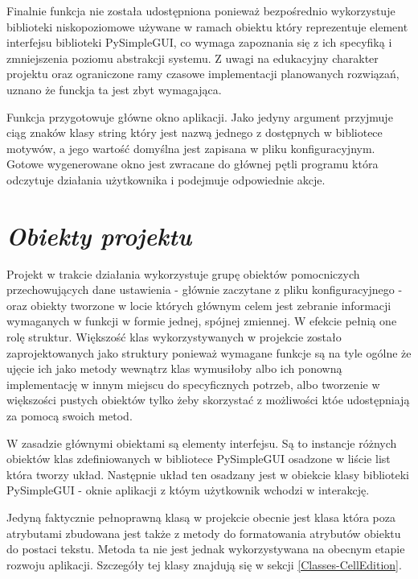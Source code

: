 \documentclass[a4paper,10pt, twoside]{report}
\newcommand{\customstylesection}[1]{\textbf{\textit{#1}}}
\begin{document}
{Finalnie funkcja nie została udostępniona ponieważ bezpośrednio wykorzystuje 
biblioteki niskopoziomowe używane w ramach obiektu który reprezentuje element 
interfejsu biblioteki PySimpleGUI, co wymaga zapoznania się z ich specyfiką i 
zmniejszenia poziomu abstrakcji systemu. Z uwagi na edukacyjny charakter 
projektu oraz ograniczone ramy czasowe implementacji planowanych rozwiązań, 
uznano że funckja ta jest zbyt wymagająca.}

\medskip
{Funkcja  przygotowuje główne okno 
aplikacji. Jako jedyny argument  przyjmuje ciąg znaków klasy 
string który jest nazwą jednego z dostępnych w bibliotece motywów, a jego 
wartość domyślna jest zapisana w pliku konfiguracyjnym. Gotowe wygenerowane okno
 jest zwracane do głównej pętli programu która odczytuje działania użytkownika i
 podejmuje odpowiednie akcje.}

\section{\customstylesection{Obiekty projektu}}
{Projekt w trakcie działania wykorzystuje grupę obiektów pomocniczych 
przechowujących dane ustawienia - głównie zaczytane z pliku konfiguracyjnego - 
oraz obiekty tworzone w locie których głównym celem jest zebranie informacji 
wymaganych w funkcji w formie jednej, spójnej zmiennej. W efekcie pełnią one 
rolę struktur. Większość klas wykorzystywanych w projekcie zostało 
zaprojektowanych jako struktury ponieważ wymagane funkcje są na tyle ogólne że 
ujęcie ich jako metody wewnątrz klas wymusiłoby albo ich ponowną implementację w
 innym miejscu do specyficznych potrzeb, albo tworzenie w większości pustych 
obiektów tylko żeby skorzystać z możliwości któe udostępniają za pomocą swoich 
metod.}

{W zasadzie głównymi obiektami są elementy interfejsu. Są to instancje różnych 
obiektów klas zdefiniowanych w bibliotece PySimpleGUI osadzone w liście list 
która tworzy układ. Następnie układ ten osadzany jest w obiekcie klasy 
 biblioteki PySimpleGUI - oknie aplikacji z któym użytkownik 
wchodzi w interakcję.}

{Jedyną faktycznie pełnoprawną klasą w projekcie obecnie jest klasa 
 która poza atrybutami zbudowana jest także z metody 
 do formatowania atrybutów obiektu do postaci tekstu. 
Metoda ta nie jest jednak wykorzystywana na obecnym etapie rozwoju aplikacji. 
Szczegóły tej klasy znajdują się w sekcji \ref*{Classes-CellEdition}.}
\end{document}
